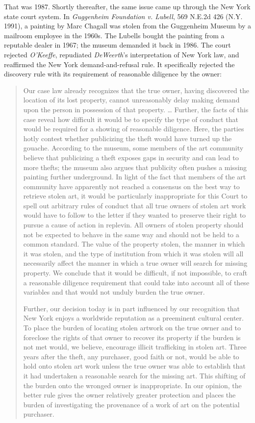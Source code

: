 That was 1987. Shortly thereafter, the same issue came up through the New York
state court system. In \textit{Guggenheim Foundation v. Lubell}, 569 N.E.2d 426
(N.Y. 1991), a painting by Marc Chagall was stolen from the Guggenheim Museum
by a mailroom employee in the 1960s. The Lubells bought the painting from a
reputable dealer in 1967; the museum demanded it back in 1986. The court
rejected \textit{O'Keeffe}, repudiated \textit{DeWeerth}{}'s interpretation of
New York law, and reaffirmed the New York demand-and-refusal rule. It
specifically rejected the discovery rule with its requirement of reasonable
diligence by the owner:
\begin{quotation}
Our case law already recognizes that the true owner, having discovered the
location of its lost property, cannot unreasonably delay making demand upon the
person in possession of that property. \dots{} Further, the facts of this case
reveal how difficult it would be to specify the type of conduct that would be
required for a showing of reasonable diligence. Here, the parties hotly contest
whether publicizing the theft would have turned up the gouache. According to
the museum, some members of the art community believe that publicizing a theft
exposes gaps in security and can lead to more thefts; the museum also argues
that publicity often pushes a missing painting further underground. In light of
the fact that members of the art community have apparently not reached a
consensus on the best way to retrieve stolen art, it would be particularly
inappropriate for this Court to spell out arbitrary rules of conduct that all
true owners of stolen art work would have to follow to the letter if they
wanted to preserve their right to pursue a cause of action in replevin. All
owners of stolen property should not be expected to behave in the same way and
should not be held to a common standard. The value of the property stolen, the
manner in which it was stolen, and the type of institution from which it was
stolen will all necessarily affect the manner in which a true owner will search
for missing property. We conclude that it would be difficult, if not
impossible, to craft a reasonable diligence requirement that could take into
account all of these variables and that would not unduly burden the true owner.

Further, our decision today is in part influenced by our recognition that New
York enjoys a worldwide reputation as a preeminent cultural center. To place
the burden of locating stolen artwork on the true owner and to foreclose the
rights of that owner to recover its property if the burden is not met would, we
believe, encourage illicit trafficking in stolen art. Three years after the
theft, any purchaser, good faith or not, would be able to hold onto stolen art
work unless the true owner was able to establish that it had undertaken a
reasonable search for the missing art. This shifting of the burden onto the
wronged owner is inappropriate. In our opinion, the better rule gives the owner
relatively greater protection and places the burden of investigating the
provenance of a work of art on the potential purchaser.
\end{quotation}

